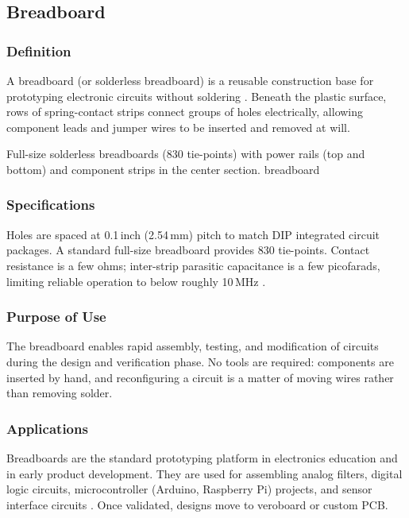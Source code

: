 \subsection{Breadboard}

\subsubsection*{Definition}
A breadboard (or solderless breadboard) is a reusable construction base for prototyping
electronic circuits without soldering \cite{wiki:breadboard}. Beneath the plastic
surface, rows of spring-contact strips connect groups of holes electrically, allowing
component leads and jumper wires to be inserted and removed at will.

%
  {Full-size solderless breadboards (830 tie-points) with power rails
   (top and bottom) and component strips in the center section.}%
  {breadboard}

\subsubsection*{Specifications}
Holes are spaced at 0.1\,inch (2.54\,mm) pitch to match DIP integrated circuit packages.
A standard full-size breadboard provides 830 tie-points. Contact resistance is a few
ohms; inter-strip parasitic capacitance is a few picofarads, limiting reliable operation
to below roughly 10\,MHz \cite{analog:breadboard}.

\subsubsection*{Purpose of Use}
The breadboard enables rapid assembly, testing, and modification of circuits during the
design and verification phase. No tools are required: components are inserted by hand,
and reconfiguring a circuit is a matter of moving wires rather than removing solder.

\subsubsection*{Applications}
Breadboards are the standard prototyping platform in electronics education and in early
product development. They are used for assembling analog filters, digital logic circuits,
microcontroller (Arduino, Raspberry Pi) projects, and sensor interface circuits
\cite{analog:breadboard}. Once validated, designs move to veroboard or custom PCB.

